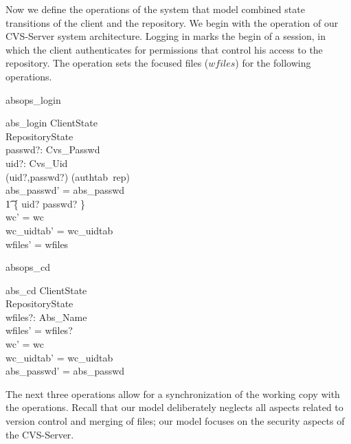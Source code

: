 Now we define the operations of the system that model combined state transitions
of the client and the repository.  We begin with the  operation of
our CVS-Server system architecture.  Logging in marks the begin of a session, in
which the client authenticates for permissions that control his access to the
repository.  The operation  sets the focused files ($wfiles$) for the
following operations.
\begin{zedgroup}
  \begin{doc}{absops_login}
    \begin{schema}{abs\_login}
      \Delta ClientState \\
      \Xi RepositoryState \\
      passwd?: Cvs\_Passwd \\
      uid?: Cvs\_Uid \\
      \where
      (uid?,passwd?) \in \dom (authtab~rep) \\
      abs\_passwd' = abs\_passwd \\
      \t1 \oplus \{ uid? \mapsto passwd? \} \\
      wc' = wc \\
      wc\_uidtab' = wc\_uidtab \\
      wfiles' = wfiles \\
    \end{schema}
  \end{doc}
  \begin{doc}{absops_cd}
    \begin{schema}{abs\_cd}
      \Delta ClientState \\
      \Xi RepositoryState \\
      wfiles?: \power Abs\_Name \\
      \where
      wfiles' = wfiles? \\
      wc' = wc \\
      wc\_uidtab' = wc\_uidtab \\
      abs\_passwd' = abs\_passwd \\
    \end{schema}
  \end{doc}
\end{zedgroup}

The next three operations allow for a synchronization of the working copy with
the operations. Recall that our model deliberately neglects all aspects related
to version control and merging of files; our model focuses on the security
aspects of the CVS-Server.

